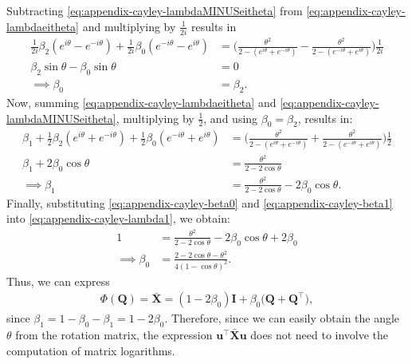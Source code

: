 Subtracting \eqref{eq:appendix-cayley-lambdaMINUSeitheta} from \eqref{eq:appendix-cayley-lambdaeitheta} and multiplying by $\frac{1}{2i}$ results in
\begin{align}
    \frac{1}{2i}\beta_2(e^{i\theta}-e^{-i\theta}) +\frac{1}{2i}\beta_0(e^{-i\theta}-e^{i\theta}) &= \biggl(\frac{\theta^2}{2 - (e^{i\theta}+ e^{-i\theta})} - \frac{\theta^2}{2 - (e^{-i\theta}+ e^{i\theta})}\biggr)\frac{1}{2i}\\
    \beta_2\sin\theta -\beta_0\sin\theta &= 0\\
    \implies \beta_0&=\beta_2. \label{eq:appendix-cayley-beta0}
\end{align}
Now, summing \eqref{eq:appendix-cayley-lambdaeitheta} and \eqref{eq:appendix-cayley-lambdaMINUSeitheta}, multiplying by $\frac{1}{2}$, and using $\beta_0=\beta_2$, results in:
\begin{align}
    \beta_1+\frac{1}{2}\beta_2(e^{i\theta}+e^{-i\theta}) +\frac{1}{2}\beta_0(e^{-i\theta}+e^{i\theta}) &= \biggl(\frac{\theta^2}{2 - (e^{i\theta}+ e^{-i\theta})} + \frac{\theta^2}{2 - (e^{-i\theta}+ e^{i\theta})}\biggr)\frac{1}{2}\\
    \beta_1+2\beta_0\cos\theta  &= \frac{\theta^2}{2 - 2\cos\theta}\\
    \implies \beta_1&=\frac{\theta^2}{2 - 2\cos\theta} - 2\beta_0\cos\theta. \label{eq:appendix-cayley-beta1}
\end{align}
Finally, substituting \eqref{eq:appendix-cayley-beta0} and \eqref{eq:appendix-cayley-beta1} into \eqref{eq:appendix-cayley-lambda1}, we obtain:
\begin{align}
    1 &= \frac{\theta^2}{2 - 2\cos\theta} - 2\beta_0\cos\theta + 2\beta_0 \\
    \implies \beta_0 &= \frac{2-2\cos\theta-\theta^2}{4(1 - \cos\theta)^2}. 
\end{align}
Thus, we can express
\begin{align}
    \Phi(\mathbf{Q}) = \bar{\mathbf{X}} = (1-2\beta_0)\mathbf{I} + \beta_0\bigl(\mathbf{Q} + \mathbf{Q}^\top\bigr), \label{eq:appendix-explicit-X-bar-eedist}
\end{align}
since $\beta_1=1-\beta_0-\beta_1=1-2\beta_0$. Therefore, since we can easily obtain the angle $\theta$ from the rotation matrix, the expression $\mathbf{u}^\top\bar{\mathbf{X}}\mathbf{u}$ does not need to involve the computation of matrix logarithms.

